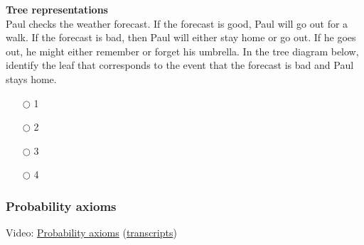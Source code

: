 \documentclass[pdftex, brazil, 12pt, twoside]{article}
\begin{document}
\begin{exercise}
  \textbf{Tree representations}\\
  Paul checks the weather forecast. If the forecast is good, Paul will go out for
  a walk. If the forecast is bad, then Paul will either stay home or go out. If
  he goes out, he might either remember or forget his umbrella. In the tree diagram
  below, identify the leaf that corresponds to the event that the forecast is bad
  and Paul stays home.

  \begin{figure}[H]
    \begin{center}
    \end{center}
  \end{figure}

  \begin{itemize}[noitemsep]
  \item[$\bigcirc$] 1
  \item[$\bigcirc$] 2
  \item[$\bigcirc$] 3
  \item[$\bigcirc$] 4
  \end{itemize}
\end{exercise}

\subsubsection{Probability axioms}
\label{un1-lec1-prob-axioms}

Video: \href{https://www.youtube.com/watch?v=2J5Vr-kB\_c4}{Probability axioms}
(\href{Unit-1/01\_lecture\_1\_probability\_models\_and\_axioms/l01\_3\_transcripts.pdf}{transcripts})
\end{document}

